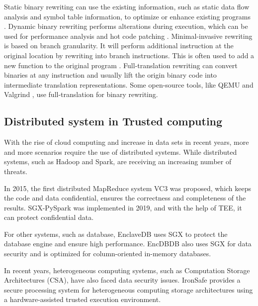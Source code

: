 Static binary rewriting can use the existing information, such as static data flow analysis and
symbol table information, to optimize or enhance existing programs \cite{10.1145/2629335, Schwarz2007PLTOAL}. 
Dynamic binary rewriting performs alterations during execution, which can be used for
performance analysis \cite{Luk2005PinBC} and hot code patching \cite{Bruening2003AnIF}.
Minimal-invasive rewriting is based on branch granularity. It will perform additional instruction
at the original location by rewriting into branch instructions. This is often used to add a new
function to the original program \cite{Federico2017revngAU}.
Full-translation rewriting can convert binaries at any instruction and usually lift the origin
binary code into intermediate translation representations. Some open-source tools,
like QEMU \cite{Bellard2005QEMUAF} and Valgrind \cite{Nethercote2007ValgrindAF},
use full-translation for binary rewriting.


\subsection{Distributed system in Trusted computing}
With the rise of cloud computing and increase in data sets in recent years,
more and more scenarios require the use of distributed systems.
While distributed systems, such as Hadoop and Spark, are receiving an increasing number
of threats.

In 2015, the first distributed MapReduce system VC3 \cite{Schuster2015VC3TD} was proposed,
which keeps the code and data confidential, ensures the correctness and completeness of the results.
SGX-PySpark \cite{Quoc2019SGXPySparkSD} was implemented in 2019, and with the help of TEE,
it can protect confidential data.

For other systems, such as database, EnclaveDB \cite{Priebe2018EnclaveDBAS} uses SGX to
protect the database engine and ensure high performance.
EncDBDB \cite{Fuhry2021EncDBDBSE} also uses SGX for data security and is optimized for
column-oriented in-memory databases.

In recent years, heterogeneous computing systems, such as Computation Storage Architectures (CSA), 
have also faced data security issues.
IronSafe \cite{Unnibhavi2022SecureAP} provides a secure processing system for heterogeneous
computing storage architectures using a hardware-assisted trusted execution environment.